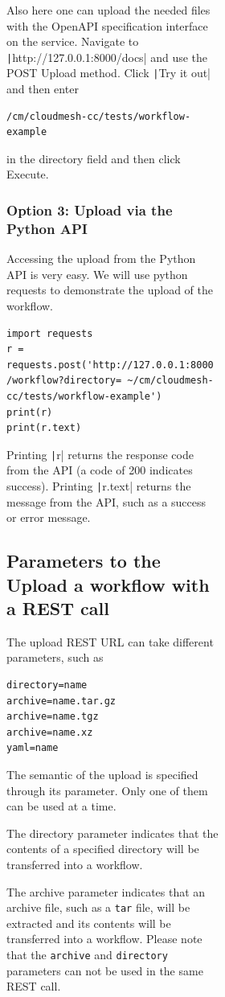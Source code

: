 \begin{figure}[htb]
\begin{figure}[htb]
\begin{figure}[htb]
Also here one can upload the needed files with the OpenAPI specification
interface on the service. Navigate to
\texttt|http://127.0.0.1:8000/docs| and use the POST Upload method. 
Click \texttt|Try it out| and then enter

\begin{verbatim}
/cm/cloudmesh-cc/tests/workflow-example
\end{verbatim}

in the
directory field and then click Execute.

\subsubsection{Option 3: Upload via the Python
API}\label{option-3-upload-via-the-python-api-1}

Accessing the upload from the Python API is very easy. We will use
python requests to demonstrate the upload of the workflow.

\smallskip
\begin{verbatim}
import requests
r = requests.post('http://127.0.0.1:8000 /workflow?directory= ~/cm/cloudmesh-cc/tests/workflow-example')
print(r)
print(r.text)
\end{verbatim}
\smallskip

Printing \texttt|r| returns the response code from the API (a code of
200 indicates success). Printing \texttt|r.text| returns the message
from the API, such as a success or error message.

\subsection{Parameters to the Upload a workflow with a REST
call}\label{parameters-to-the-upload-a-workflow-with-a-rest-call}

The upload REST URL can take different parameters, such as

\begin{verbatim}
directory=name
archive=name.tar.gz
archive=name.tgz
archive=name.xz
yaml=name
\end{verbatim}

The semantic of the upload is specified through its parameter. Only one
of them can be used at a time.

The directory parameter indicates that the contents of a specified
directory will be transferred into a workflow.

The archive parameter indicates that an archive file, such as a
\texttt{tar} file, will be extracted and its contents will be
transferred into a workflow. Please note that the \texttt{archive} and
\texttt{directory} parameters can not be used in the same REST call.


\end{figure}
\end{figure}
\end{figure}
